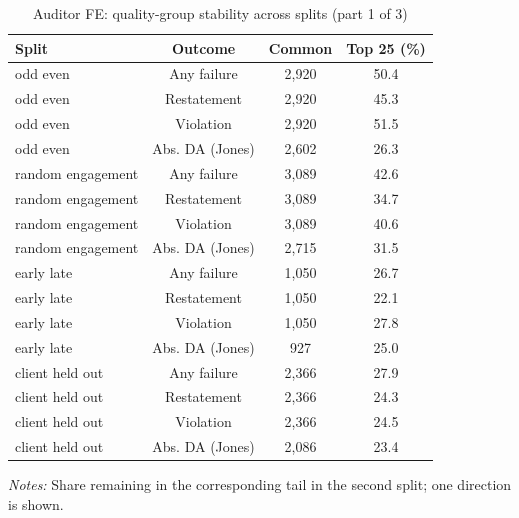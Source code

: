 \begin{table}[htbp]
\footnotesize
\centering
\caption{Auditor FE: quality-group stability across splits (part 1 of 3)}
\begin{threeparttable}
\begin{tabular}{p{}ccc}
\toprule
Split & Outcome & Common & Top 25 (\%) \\
\midrule
odd even & Any failure & 2,920 & 50.4 \\
odd even & Restatement & 2,920 & 45.3 \\
odd even & Violation & 2,920 & 51.5 \\
odd even & Abs. DA (Jones) & 2,602 & 26.3 \\
random engagement & Any failure & 3,089 & 42.6 \\
random engagement & Restatement & 3,089 & 34.7 \\
random engagement & Violation & 3,089 & 40.6 \\
random engagement & Abs. DA (Jones) & 2,715 & 31.5 \\
early late & Any failure & 1,050 & 26.7 \\
early late & Restatement & 1,050 & 22.1 \\
early late & Violation & 1,050 & 27.8 \\
early late & Abs. DA (Jones) & 927 & 25.0 \\
client held out & Any failure & 2,366 & 27.9 \\
client held out & Restatement & 2,366 & 24.3 \\
client held out & Violation & 2,366 & 24.5 \\
client held out & Abs. DA (Jones) & 2,086 & 23.4 \\
\bottomrule
\end{tabular}
\begin{tablenotes}\footnotesize
\item \raggedright \textit{Notes:} Share remaining in the corresponding tail in the second split; one direction is shown.
\end{tablenotes}
\end{threeparttable}
\end{table}

